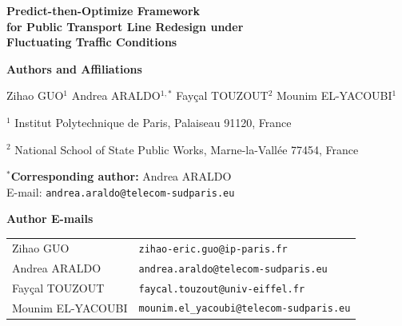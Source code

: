 \documentclass[a4paper,12pt]{article}
\begin{document}

\begin{center}
  {\LARGE\bfseries
    Predict-then-Optimize Framework\\
    for Public Transport Line Redesign under\\
    Fluctuating Traffic Conditions}
\end{center}

\vspace{1.5em}

\noindent\textbf{Authors and Affiliations}

\vspace{0.5em}

\noindent
Zihao GUO$^{1}$ \quad
Andrea ARALDO$^{1,*}$ \quad
Fay\c{c}al TOUZOUT$^{2}$ \quad
Mounim EL-YACOUBI$^{1}$

\vspace{0.5em}

\noindent
$^{1}$ Institut Polytechnique de Paris,
Palaiseau 91120, France

\noindent
$^{2}$ National School of State Public Works, Marne-la-Vall\'{e}e 77454, France

\vspace{0.5em}

\noindent $^{*}$\textbf{Corresponding author:} Andrea ARALDO\\
\noindent E-mail: \texttt{andrea.araldo@telecom-sudparis.eu} \quad

\vspace{1.5em}

\noindent\textbf{Author E-mails}

\vspace{0.3em}

\begin{tabular}{ll}
  Zihao GUO       & \texttt{zihao-eric.guo@ip-paris.fr} \\
  Andrea ARALDO   & \texttt{andrea.araldo@telecom-sudparis.eu} \\
  Fay\c{c}al TOUZOUT & \texttt{faycal.touzout@univ-eiffel.fr} \\
  Mounim EL-YACOUBI & \texttt{mounim.el\_yacoubi@telecom-sudparis.eu} \\
\end{tabular}
\end{document}
